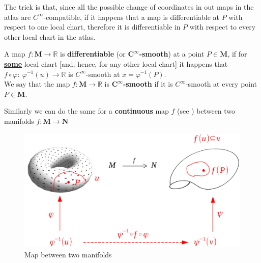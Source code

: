 \documentclass[../main.tex]{subfiles}
\begin{document}
The trick is that, since all the possible change of coordinates in out maps in the atlas are $C^\infty$-compatible, if it happens that a map is differentiable at $P$ with respect to one local chart, therefore it is differentiable in $P$ with respect to every other local chart in the atlas.
\begin{definition}
A map $f:\mathbf{M}\to\mathbb{R}$ is \textbf{differentiable} (or $\mathbf{C}^\infty$\textbf{-smooth}) at a point $P\in\mathbf{M}$, if for \underline{\textbf{some}} local chart [and, hence, for any other local chart] it happens that $f\circ\varphi: \ \varphi^{-1}(u) \to \mathbb{R}$ is $C^\infty$-smooth at $x=\varphi^{-1}(P)$.\\
We say that the map $f:\mathbf{M}\to\mathbb{R}$ is $\mathbf{C}^\infty$\textbf{-smooth} if it is $C^\infty$-smooth at every point $P\in\mathbf{M}$.
\end{definition}
Similarly we can do the same for a \textbf{continuous} map $f$ (see ) between two manifolds $f:\mathbf{M}\to\mathbf{N}$
\begin{figure}[H]
	\includegraphics{images/diff_map.pdf}
	\caption[Map between two manifolds]{Map between two manifolds}
\end{figure} 
\end{document}

